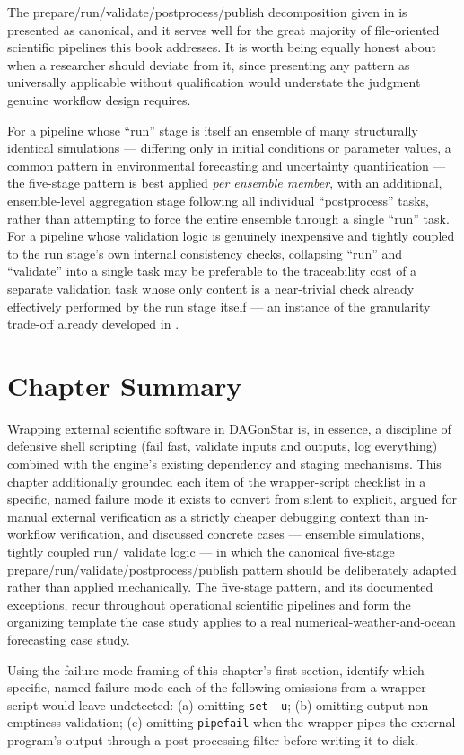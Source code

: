 The prepare/run/validate/postprocess/publish decomposition given in
 is presented as canonical, and it serves well
for the great majority of file-oriented scientific pipelines this book
addresses. It is worth being equally honest about when a researcher should
deviate from it, since presenting any pattern as universally applicable
without qualification would understate the judgment genuine workflow design
requires.

For a pipeline whose ``run'' stage is itself an ensemble of many
structurally identical simulations --- differing only in initial conditions
or parameter values, a common pattern in environmental forecasting and
uncertainty quantification --- the five-stage pattern is best applied
\emph{per ensemble member}, with an additional, ensemble-level aggregation
stage following all individual ``postprocess'' tasks, rather than attempting
to force the entire ensemble through a single ``run'' task. For a pipeline
whose validation logic is genuinely inexpensive and tightly coupled to the
run stage's own internal consistency checks, collapsing ``run'' and
``validate'' into a single task may be preferable to the traceability cost
of a separate validation task whose only content is a near-trivial check
already effectively performed by the run stage itself --- an instance of the
granularity trade-off already developed in .

\section{Chapter Summary}

Wrapping external scientific software in DAGonStar is, in essence, a
discipline of defensive shell scripting (fail fast, validate inputs and
outputs, log everything) combined with the engine's existing dependency and
staging mechanisms. This chapter additionally grounded each item of the
wrapper-script checklist in a specific, named failure mode it exists to
convert from silent to explicit, argued for manual external verification as
a strictly cheaper debugging context than in-workflow verification, and
discussed concrete cases --- ensemble simulations, tightly coupled run/
validate logic --- in which the canonical five-stage
prepare/run/validate/postprocess/publish pattern should be deliberately
adapted rather than applied mechanically. The five-stage pattern, and its
documented exceptions, recur throughout operational scientific pipelines and
form the organizing template the case study applies to a real
numerical-weather-and-ocean forecasting case study.

\begin{exercise}
Using the failure-mode framing of this chapter's first section, identify
which specific, named failure mode each of the following omissions from a
wrapper script would leave undetected: (a) omitting \texttt{set -u}; (b)
omitting output non-emptiness validation; (c) omitting \texttt{pipefail}
when the wrapper pipes the external program's output through a
post-processing filter before writing it to disk.
\end{exercise}
